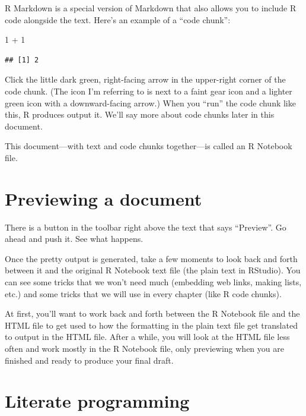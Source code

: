 \documentclass[
]{book}
\newenvironment{Shaded}{\begin{snugshade}}{\end{snugshade}}
\newcommand{\DecValTok}[1]{\textcolor[rgb]{0.00,0.00,0.81}{#1}}
\newcommand{\SpecialCharTok}[1]{\textcolor[rgb]{0.00,0.00,0.00}{#1}}
\begin{document}
R Markdown is a special version of Markdown that also allows you to include R code alongside the text. Here's an example of a ``code chunk'':

\begin{Shaded}
\begin{Highlighting}[]
\DecValTok{1} \SpecialCharTok{+} \DecValTok{1}
\end{Highlighting}
\end{Shaded}

\begin{verbatim}
## [1] 2
\end{verbatim}

Click the little dark green, right-facing arrow in the upper-right corner of the code chunk. (The icon I'm referring to is next to a faint gear icon and a lighter green icon with a downward-facing arrow.) When you ``run'' the code chunk like this, R produces output it. We'll say more about code chunks later in this document.

This document---with text and code chunks together---is called an R Notebook file.

\hypertarget{rmark-previewing}{%
\section{Previewing a document}\label{rmark-previewing}}

There is a button in the toolbar right above the text that says ``Preview''. Go ahead and push it. See what happens.

Once the pretty output is generated, take a few moments to look back and forth between it and the original R Notebook text file (the plain text in RStudio). You can see some tricks that we won't need much (embedding web links, making lists, etc.) and some tricks that we will use in every chapter (like R code chunks).

At first, you'll want to work back and forth between the R Notebook file and the HTML file to get used to how the formatting in the plain text file get translated to output in the HTML file. After a while, you will look at the HTML file less often and work mostly in the R Notebook file, only previewing when you are finished and ready to produce your final draft.

\hypertarget{rmark-literate}{%
\section{Literate programming}\label{rmark-literate}}
\end{document}
